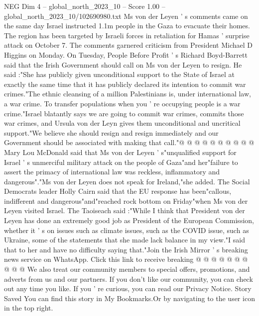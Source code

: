 \begin{textsample}{NEG Dim 4 – global\_north\_2023\_10 – Score 1.00 – global\_north\_2023\_10/102690980.txt}  \label{ex:f4_neg_006}
Ms von der Leyen ' s comments came on the same day Israel instructed 1.1m people in the Gaza to evacuate their homes.
The region has been targeted by Israeli forces in retaliation for Hamas ' surprise attack on October 7.
The comments garnered criticism from President Michael D Higgins on Monday.
On Tuesday, People Before Profit ' s Richard Boyd-Barrett said that the Irish Government should call on Ms von der Leyen to resign.
He said :"She has publicly given unconditional support to the State of Israel at exactly the same time that it has publicly declared its intention to commit war crimes."The ethnic cleansing of a million Palestinians is, under international law, a war crime.
To transfer populations when you ' re occupying people is a war crime."Israel blatantly says we are going to commit war crimes, commits those war crimes, and Ursula von der Leyn gives them unconditional and uncritical support."We believe she should resign and resign immediately and our Government should be associated with making that call."@ @ @ @ @ @ @ @ @ @ Mary Lou McDonald said that Ms von der Leyen ' s"unqualified support for Israel ' s unmerciful military attack on the people of Gaza"and her"failure to assert the primacy of international law was reckless, inflammatory and dangerous"."Ms von der Leyen does not speak for Ireland,"she added.
The Social Democrats leader Holly Cairn said that the EU response has been"callous, indifferent and dangerous"and"reached rock bottom on Friday"when Ms von der Leyen visited Israel.
The Taoiseach said :"While I think that President von der Leyen has done an extremely good job as President of the European Commission, whether it ' s on issues such as climate issues, such as the COVID issue, such as Ukraine, some of the statements that she made lack balance in my view."I said that to her and have no difficulty saying that."Join the Irish Mirror ' s breaking news service on WhatsApp.
Click this link to receive breaking @ @ @ @ @ @ @ @ @ @ We also treat our community members to special offers, promotions, and adverts from us and our partners.
If you don't like our community, you can check out any time you like.
If you ' re curious, you can read our Privacy Notice.
Story Saved You can find this story in My Bookmarks.Or by navigating to the user icon in the top right.

\end{textsample}
